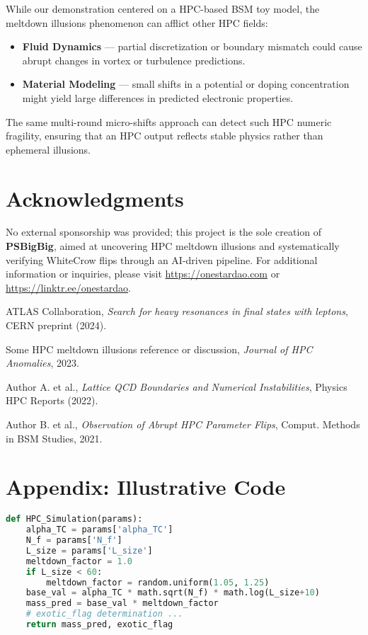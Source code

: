 \documentclass[11pt]{article}
\begin{document}
While our demonstration centered on a HPC-based BSM toy model,
the meltdown illusions phenomenon can afflict other HPC fields:
\begin{itemize}
\item \textbf{Fluid Dynamics} --- partial discretization or boundary mismatch
      could cause abrupt changes in vortex or turbulence predictions.
\item \textbf{Material Modeling} --- small shifts in a potential or doping concentration
      might yield large differences in predicted electronic properties.
\end{itemize}
The same multi-round micro-shifts approach can detect
such HPC numeric fragility, ensuring that an HPC output
reflects stable physics rather than ephemeral illusions.

\section*{Acknowledgments}
No external sponsorship was provided; this project is the sole creation
of \textbf{PSBigBig}, aimed at uncovering HPC meltdown illusions
and systematically verifying WhiteCrow flips through an AI-driven pipeline.
For additional information or inquiries, please visit
\url{https://onestardao.com} or \url{https://linktr.ee/onestardao}.

\begin{thebibliography}{9}

ATLAS Collaboration, 
\textit{Search for heavy resonances in final states with leptons},
CERN preprint (2024).

Some HPC meltdown illusions reference or discussion,
\textit{Journal of HPC Anomalies}, 2023.

Author A. et al., 
\textit{Lattice QCD Boundaries and Numerical Instabilities},
Physics HPC Reports (2022).

Author B. et al.,
\textit{Observation of Abrupt HPC Parameter Flips},
Comput. Methods in BSM Studies, 2021.

\end{thebibliography}


\appendix
\section{Appendix: Illustrative Code}
\label{sec:appendix-code}

\begin{lstlisting}[language=Python, caption=Toy HPC snippet]
def HPC_Simulation(params):
    alpha_TC = params['alpha_TC']
    N_f = params['N_f']
    L_size = params['L_size']
    meltdown_factor = 1.0
    if L_size < 60:
        meltdown_factor = random.uniform(1.05, 1.25)
    base_val = alpha_TC * math.sqrt(N_f) * math.log(L_size+10)
    mass_pred = base_val * meltdown_factor
    # exotic_flag determination ...
    return mass_pred, exotic_flag
\end{lstlisting}
\end{document}
